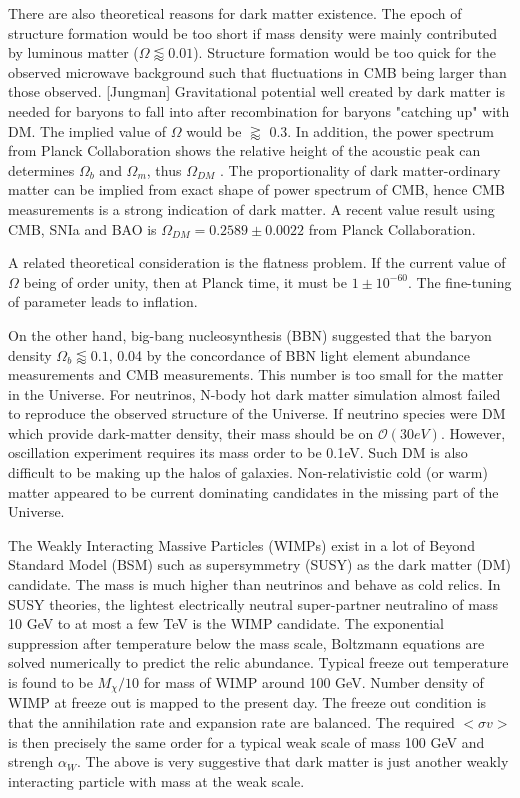 \documentclass[12pt]{article}
\begin{document}
There are also theoretical reasons for dark matter existence. The epoch of structure formation would be too short if mass density were mainly contributed by luminous matter ($\Omega \lessapprox 0.01$). Structure formation would be too quick for the observed microwave background such that fluctuations in CMB being larger than those observed. [Jungman] Gravitational potential well created by dark matter is needed for baryons to fall into after recombination for baryons "catching up" with DM.  The implied value of $\Omega$ would be $\gtrapprox$ 0.3. In addition, the power spectrum from Planck Collaboration shows the relative height of the acoustic peak can determines $\Omega_b$ and $\Omega_m$, thus $\Omega_{DM}$ . The proportionality of dark matter-ordinary matter can be implied from exact shape of power spectrum of CMB, hence CMB measurements is a strong indication of dark matter. A recent value result using CMB, SNIa and BAO is $\Omega_{DM} = 0.2589 \pm 0.0022$ from Planck Collaboration.

A related theoretical consideration is the flatness problem. If the current value of $\Omega$ being of order unity, then at Planck time, it must be $1\pm 10^{-60}$. The fine-tuning of parameter leads to inflation. 
 
 On the other hand, big-bang nucleosynthesis (BBN) suggested that the baryon density $\Omega_b \lessapprox 0.1$, 0.04 by the concordance of BBN light element abundance measurements and CMB measurements. This number is too small for the matter in the Universe. For neutrinos, N-body hot dark matter simulation almost failed to reproduce the observed structure of the Universe. If neutrino species were DM which provide dark-matter density, their mass should be on $\mathcal O(30 eV)$. However, oscillation experiment requires its mass order to be 0.1eV.  Such DM is also difficult to be making up the halos of galaxies. Non-relativistic cold (or warm) matter appeared to be current dominating candidates in the missing part of the Universe. 


The Weakly Interacting Massive Particles (WIMPs) exist in a lot of Beyond Standard Model (BSM) such as supersymmetry (SUSY) as the dark matter (DM) candidate.  The mass is much higher than neutrinos and behave as cold relics. In SUSY theories, the lightest electrically neutral super-partner neutralino of mass 10 GeV to at most a few TeV is the WIMP candidate. The exponential suppression after temperature below the mass scale, 
 Boltzmann equations are solved numerically to predict the relic abundance. Typical freeze out temperature is found to be $M_\chi/10$ for mass of WIMP around 100 GeV. Number density of WIMP at freeze out is mapped to the present day. The freeze out condition is that the annihilation rate and expansion rate are balanced. 
The required $<\sigma v>$ is then precisely the same order for a typical weak scale of mass 100 GeV and strengh $\alpha_W$.  The above is very suggestive that dark matter is just another weakly interacting particle with mass at the weak scale. 
 
\end{document}
